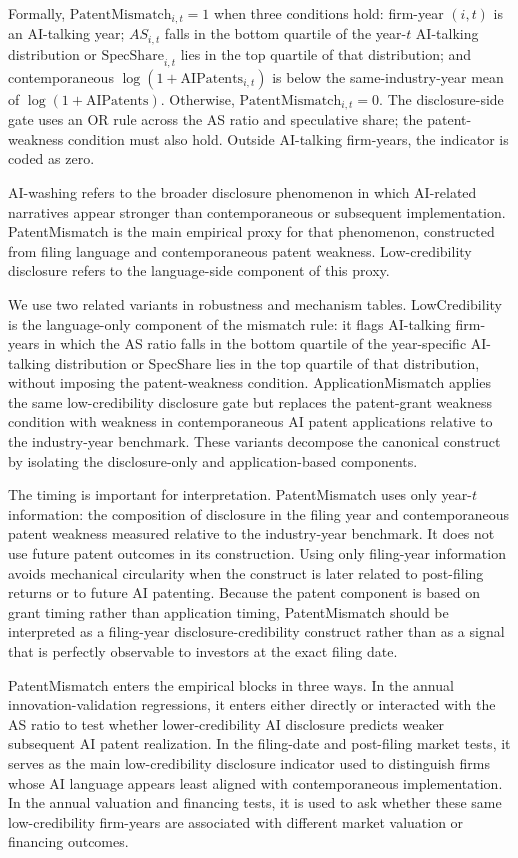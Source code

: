 Formally, $\mathrm{PatentMismatch}_{i,t}=1$ when three conditions hold: firm-year $(i,t)$ is an AI-talking year; $AS_{i,t}$ falls in the bottom quartile of the year-$t$ AI-talking distribution or $\mathrm{SpecShare}_{i,t}$ lies in the top quartile of that distribution; and contemporaneous $\log(1+\mathrm{AIPatents}_{i,t})$ is below the same-industry-year mean of $\log(1+\mathrm{AIPatents})$. Otherwise, $\mathrm{PatentMismatch}_{i,t}=0$. The disclosure-side gate uses an OR rule across the AS ratio and speculative share; the patent-weakness condition must also hold. Outside AI-talking firm-years, the indicator is coded as zero.

AI-washing refers to the broader disclosure phenomenon in which AI-related narratives appear stronger than contemporaneous or subsequent implementation. PatentMismatch is the main empirical proxy for that phenomenon, constructed from filing language and contemporaneous patent weakness. Low-credibility disclosure refers to the language-side component of this proxy.

We use two related variants in robustness and mechanism tables. LowCredibility is the language-only component of the mismatch rule: it flags AI-talking firm-years in which the AS ratio falls in the bottom quartile of the year-specific AI-talking distribution or SpecShare lies in the top quartile of that distribution, without imposing the patent-weakness condition. ApplicationMismatch applies the same low-credibility disclosure gate but replaces the patent-grant weakness condition with weakness in contemporaneous AI patent applications relative to the industry-year benchmark. These variants decompose the canonical construct by isolating the disclosure-only and application-based components.

The timing is important for interpretation. PatentMismatch uses only year-$t$ information: the composition of disclosure in the filing year and contemporaneous patent weakness measured relative to the industry-year benchmark. It does not use future patent outcomes in its construction. Using only filing-year information avoids mechanical circularity when the construct is later related to post-filing returns or to future AI patenting. Because the patent component is based on grant timing rather than application timing, PatentMismatch should be interpreted as a filing-year disclosure-credibility construct rather than as a signal that is perfectly observable to investors at the exact filing date.

PatentMismatch enters the empirical blocks in three ways. In the annual innovation-validation regressions, it enters either directly or interacted with the AS ratio to test whether lower-credibility AI disclosure predicts weaker subsequent AI patent realization. In the filing-date and post-filing market tests, it serves as the main low-credibility disclosure indicator used to distinguish firms whose AI language appears least aligned with contemporaneous implementation. In the annual valuation and financing tests, it is used to ask whether these same low-credibility firm-years are associated with different market valuation or financing outcomes.

